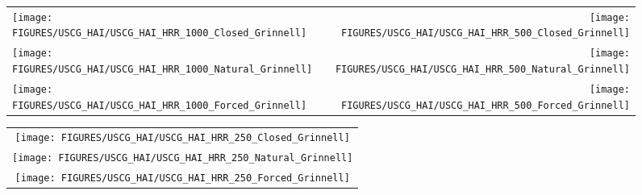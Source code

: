 \begin{figure}[p]
\begin{tabular*}{\textwidth}{l@{\extracolsep{\fill}}r}
\texttt{[image: FIGURES/USCG\_HAI/USCG\_HAI\_HRR\_1000\_Closed\_Grinnell]} &
\texttt{[image: FIGURES/USCG\_HAI/USCG\_HAI\_HRR\_500\_Closed\_Grinnell]} \\
\texttt{[image: FIGURES/USCG\_HAI/USCG\_HAI\_HRR\_1000\_Natural\_Grinnell]} &
\texttt{[image: FIGURES/USCG\_HAI/USCG\_HAI\_HRR\_500\_Natural\_Grinnell]} \\
\texttt{[image: FIGURES/USCG\_HAI/USCG\_HAI\_HRR\_1000\_Forced\_Grinnell]} &
\texttt{[image: FIGURES/USCG\_HAI/USCG\_HAI\_HRR\_500\_Forced\_Grinnell]} 
\end{tabular*}
\label{USCG_HAI_1}
\end{figure}

\begin{figure}[p]
\begin{center}
\begin{tabular}{c}
\texttt{[image: FIGURES/USCG\_HAI/USCG\_HAI\_HRR\_250\_Closed\_Grinnell]} \\
\texttt{[image: FIGURES/USCG\_HAI/USCG\_HAI\_HRR\_250\_Natural\_Grinnell]} \\
\texttt{[image: FIGURES/USCG\_HAI/USCG\_HAI\_HRR\_250\_Forced\_Grinnell]}
\end{tabular}
\end{center}
\label{USCG_HAI_2}
\end{figure}


